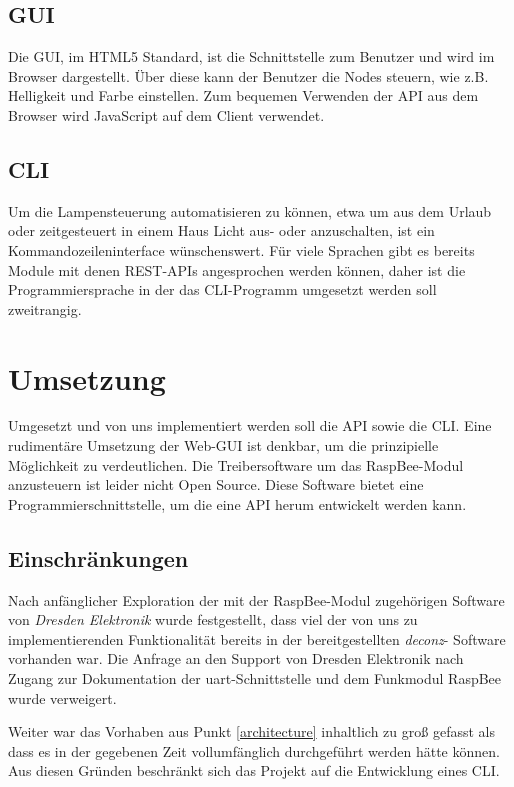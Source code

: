 \documentclass[a4paper,12pt]{article}
\begin{document}
\subsection{GUI}

Die GUI, im HTML5 Standard, ist die Schnittstelle zum Benutzer und wird im
Browser dargestellt. Über diese kann der Benutzer die Nodes steuern, wie z.B.
Helligkeit und Farbe einstellen. Zum bequemen Verwenden der API aus dem Browser
wird JavaScript auf dem Client verwendet.

\subsection{CLI}

Um die Lampensteuerung automatisieren zu können, etwa um aus dem Urlaub oder
zeitgesteuert in einem Haus Licht aus- oder anzuschalten, ist ein
Kommandozeileninterface wünschenswert. Für viele Sprachen gibt es bereits
Module mit denen REST-APIs angesprochen werden können, daher ist die
Programmiersprache in der das CLI-Programm umgesetzt werden soll zweitrangig.

\newpage

\section{Umsetzung}
\label{doing}

Umgesetzt und von uns implementiert werden soll die API sowie die CLI. Eine
rudimentäre Umsetzung der Web-GUI ist denkbar, um die prinzipielle Möglichkeit
zu verdeutlichen. Die Treibersoftware um das RaspBee-Modul anzusteuern ist
leider nicht Open Source. Diese Software bietet eine Programmierschnittstelle,
um die eine API herum entwickelt werden kann.

\subsection{Einschränkungen}

Nach anfänglicher Exploration der mit der RaspBee-Modul zugehörigen Software
von \emph{Dresden Elektronik} wurde festgestellt, dass viel der von uns zu
implementierenden Funktionalität bereits in der bereitgestellten
\emph{\acrshort{deconz}}- Software vorhanden war. Die Anfrage an den Support
von Dresden Elektronik nach Zugang zur Dokumentation der
\acrshort{uart}-Schnittstelle und dem Funkmodul RaspBee wurde verweigert.

Weiter war das Vorhaben aus Punkt \ref{architecture} inhaltlich zu groß gefasst
als dass es in der gegebenen Zeit vollumfänglich durchgeführt werden hätte
können. Aus diesen Gründen beschränkt sich das Projekt auf die Entwicklung
eines CLI.
\end{document}
